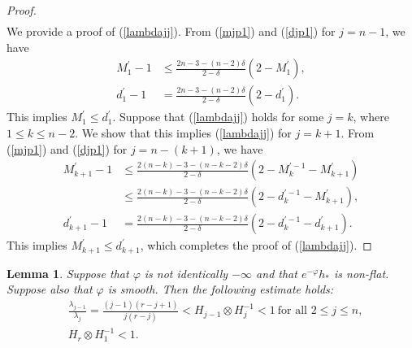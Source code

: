 \documentclass[12pt]{article}
\theoremstyle{definition}
\newtheorem{lemm}[defi]{Lemma}
\def\refe{\ast}
\begin{document}
\begin{proof}
\begin{align}
\end{align}
We provide a proof of (\ref{lambdajj}). From (\ref{mjp1}) and (\ref{djp1}) for $j=n-1$, we have
\begin{align*}
M_1^\prime-1&\leq \frac{2n-3-(n-2)\delta}{2-\delta} (2-M_1^\prime), \\
d_1^\prime-1&=\frac{2n-3-(n-2)\delta}{2-\delta} (2-d_1^\prime).
\end{align*}
This implies $M_1^\prime\leq d_1^\prime$. Suppose that (\ref{lambdajj}) holds for some $j=k$, where $1\leq k\leq n-2$. We show that this implies (\ref{lambdajj}) for $j=k+1$. From (\ref{mjp1}) and (\ref{djp1}) for $j=n-(k+1)$, we have 
\begin{align*}
M_{k+1}^\prime-1&\leq \frac{2(n-k)-3-(n-k-2)\delta}{2-\delta}(2-M_k^{\prime-1}-M_{k+1}^\prime) \\
&\leq \frac{2(n-k)-3-(n-k-2)\delta}{2-\delta}(2-d_k^{\prime-1}-M_{k+1}^\prime), \\
d_{k+1}^\prime-1&=\frac{2(n-k)-3-(n-k-2)\delta}{2-\delta}(2-d_k^{\prime-1}-d_{k+1}^\prime).
\end{align*}
This implies $M_{k+1}^\prime\leq d_{k+1}^\prime$, which completes the proof of (\ref{lambdajj}).
\end{proof}
\begin{lemm}{\it Suppose that $\varphi$ is not identically $-\infty$ and that $e^{-\varphi}h_\refe$ is non-flat. Suppose also that $\varphi$ is smooth. Then the following estimate holds:
\begin{align*}
&\frac{\lambda_{j-1}}{\lambda_j}=\frac{(j-1)(r-j+1)}{j(r-j)}<H_{j-1}\otimes H_j^{-1}<1 \ \text{for all $2\leq j\leq n$},\\
& H_r\otimes H_1^{-1}<1.
\end{align*}
}
\end{lemm}
\end{document}
